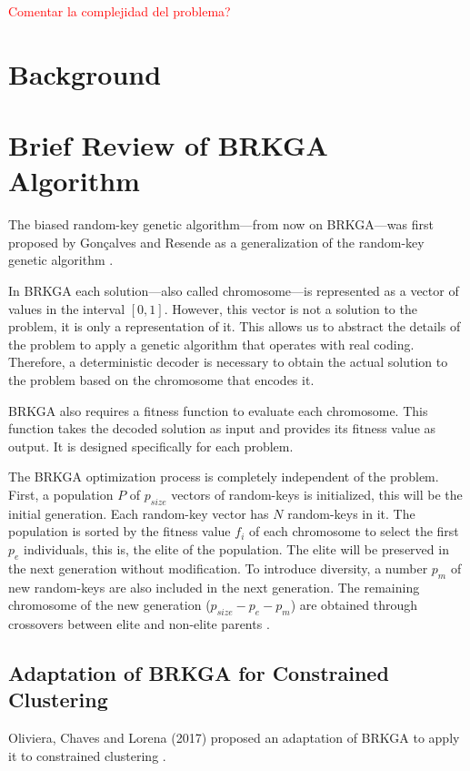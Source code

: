 \documentclass[review]{elsarticle}
\begin{document}
\textcolor{red}{Comentar la complejidad del problema?}

\section{Background}

\section{Brief Review of BRKGA Algorithm}

The biased random-key genetic algorithm---from now on BRKGA---was first proposed by Gonçalves and Resende \cite{gonccalves2011biased} as a generalization of the random-key genetic algorithm \cite{bean1994genetic}.

In BRKGA each solution---also called chromosome---is represented as a vector of values in the interval $[0,1]$. However, this vector is not a solution to the problem, it is only a representation of it. This allows us to abstract the details of the problem to apply a genetic algorithm that operates with real coding. Therefore, a deterministic decoder is necessary to obtain the actual solution to the problem based on the chromosome that encodes it. 

BRKGA also requires a fitness function to evaluate each chromosome. This function takes the decoded solution as input and provides its fitness value as output. It is designed specifically for each problem.

The BRKGA optimization process is completely independent of the problem. First, a population $P$ of $p_{size}$ vectors of random-keys is initialized, this will be the initial generation. Each random-key vector has $N$ random-keys in it. The population is sorted by the fitness value $f_i$ of each chromosome to select the first $p_e$ individuals, this is, the elite of the population. The elite will be preserved in the next generation without modification. To introduce diversity, a number $p_m$ of new random-keys are also included in the next generation. The remaining chromosome of the new generation ($p_{size} - p_e - p_m$) are obtained through crossovers between elite and non-elite parents \cite{de2017comparison}.

\subsection{Adaptation of BRKGA for Constrained Clustering}

Oliviera, Chaves and Lorena (2017) proposed an adaptation of BRKGA to apply it to constrained clustering \cite{de2017comparison}.
\end{document}
